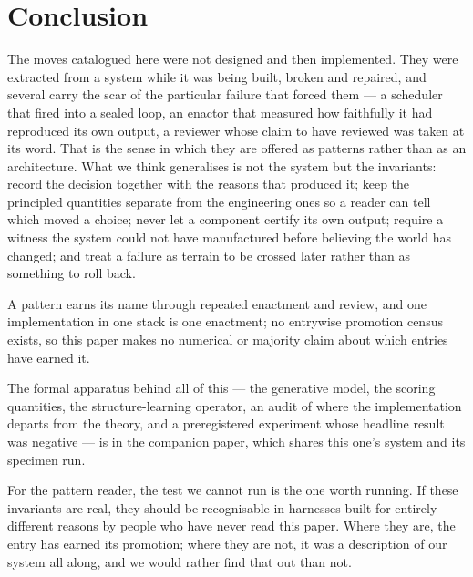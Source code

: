 \section{Conclusion}\label{sec:conclusion}

The moves catalogued here were not designed and then implemented.  They were
extracted from a system while it was being built, broken and repaired, and
several carry the scar of the particular failure that forced them --- a
scheduler that fired into a sealed loop, an enactor that measured how faithfully
it had reproduced its own output, a reviewer whose claim to have reviewed was
taken at its word.  That is the sense in which they are offered as patterns
rather than as an architecture.  What we think generalises is not the system but
the invariants: record the decision together with the reasons that produced it;
keep the principled quantities separate from the engineering ones so a reader can
tell which moved a choice; never let a component certify its own output; require
a witness the system could not have manufactured before believing the world has
changed; and treat a failure as terrain to be crossed later rather than as
something to roll back.

A pattern earns its name through repeated enactment and review, and one
implementation in one stack is one enactment; no entrywise promotion census
exists, so this paper makes no numerical or majority claim about which entries
have earned it.

The formal apparatus behind all of this --- the generative model, the scoring
quantities, the structure-learning operator, an audit of where the
implementation departs from the theory, and a preregistered experiment whose
headline result was negative --- is in the companion paper, which shares this
one's system and its specimen run.

For the pattern reader, the test we cannot run is the one worth running.  If
these invariants are real, they should be recognisable in harnesses built for
entirely different reasons by people who have never read this paper.  Where they
are, the entry has earned its promotion; where they are not, it was a description
of our system all along, and we would rather find that out than not.
